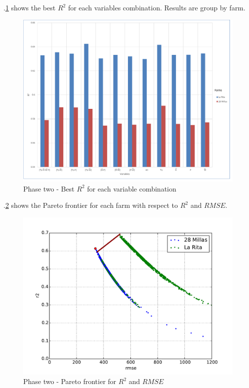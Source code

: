\documentclass[review]{elsarticle}
\begin{document}
\figurename $.$\ref{figura10} shows the best $R^2$ for each variables combination. Results are group by farm.

\begin{figure}[H] 
 \centering
 \includegraphics[scale=.5]{Phase_one_Best_R2_for_variables}
 \caption{Phase two - Best $R^2$ for each variable combination} 
 \label{figura10} 
\end{figure}

\figurename $.$\ref{figura11} shows the Pareto frontier for each farm with respect to $R^2$ and $RMSE$. 

\begin{figure}[H] 
 \centering
 \includegraphics[scale=.8]{Phase_two_R2_RMSE}
 \caption{Phase two - Pareto frontier for $R^2$ and $RMSE$} 
 \label{figura11} 
\end{figure}
\end{document}
